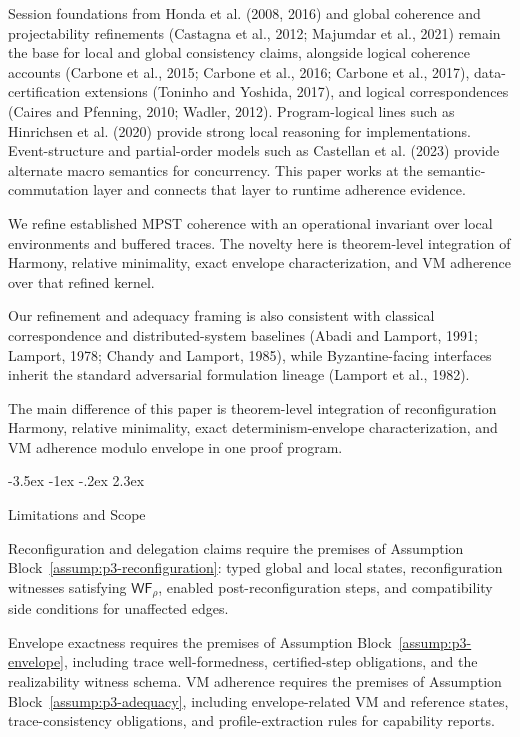 \documentclass[a4paper,10pt,twocolumn,english]{article}
\makeatletter
\renewcommand{\section}{\@startsection{section}{1}{\z@}%
  {-3.5ex \@plus -1ex \@minus -.2ex}%
  {2.3ex}%
  {\raggedright\normalfont\large\bfseries}}
\numberwithin{equation}{section}
\theoremstyle{paperdef}
\theoremstyle{paperplain}
\theoremstyle{paperdef}
\theoremstyle{paperremark}
\theoremstyle{paperdef}
\makeatother
\begin{document}
Session foundations from Honda et al. (2008, 2016) and global coherence and projectability refinements
(Castagna et al., 2012; Majumdar et al., 2021) remain the base for local and global consistency claims,
alongside logical coherence accounts (Carbone et al., 2015; Carbone et al., 2016; Carbone et al., 2017),
data-certification extensions (Toninho and Yoshida, 2017), and logical correspondences (Caires and
Pfenning, 2010; Wadler, 2012). Program-logical lines such as Hinrichsen et al. (2020) provide strong
local reasoning for implementations. Event-structure and partial-order models such as Castellan et al.
(2023) provide alternate macro semantics for concurrency. This paper works at the semantic-commutation
layer and connects that layer to runtime adherence evidence.

We refine established MPST coherence with an operational invariant over local environments and buffered
traces. The novelty here is theorem-level integration of Harmony, relative minimality, exact envelope
characterization, and VM adherence over that refined kernel.

Our refinement and adequacy framing is also consistent with classical correspondence and distributed-system baselines (Abadi and Lamport, 1991; Lamport, 1978; Chandy and Lamport, 1985), while Byzantine-facing interfaces inherit the standard adversarial formulation lineage (Lamport et al., 1982).

The main difference of this paper is theorem-level integration of reconfiguration Harmony, relative minimality, exact determinism-envelope characterization, and VM adherence modulo envelope in one proof program.

\section{Limitations and Scope}
\label{sec:limitations}

Reconfiguration and delegation claims require the premises of Assumption Block~\ref{assump:p3-reconfiguration}: typed global and local states, reconfiguration witnesses satisfying $\mathsf{WF}_\rho$, enabled post-reconfiguration steps, and compatibility side conditions for unaffected edges.

Envelope exactness requires the premises of Assumption Block~\ref{assump:p3-envelope}, including trace well-formedness, certified-step obligations, and the realizability witness schema. VM adherence requires the premises of Assumption Block~\ref{assump:p3-adequacy}, including envelope-related VM and reference states, trace-consistency obligations, and profile-extraction rules for capability reports.
\end{document}
